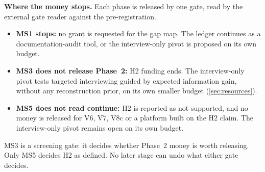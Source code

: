 \begin{keyquestionbox}
  \textbf{Where the money stops.} Each phase is released by one gate, read by the external gate
  reader against the pre-registration.
  \begin{itemize}[noitemsep]
    \item \textbf{MS1 stops:} no grant is requested for the gap map. The ledger continues as a
      documentation-audit tool, or the interview-only pivot is proposed on its own budget.
    \item \textbf{MS3 does not release Phase~2:} H2 funding ends. The interview-only pivot tests
      targeted interviewing guided by expected information gain, without any reconstruction
      prior, on its own smaller budget (\cref{sec:resources}).
    \item \textbf{MS5 does not read continue:} H2 is reported as not supported, and no money is
      released for V6, V7, V8c or a platform built on the H2 claim. The interview-only pivot
      remains open on its own budget.
  \end{itemize}
  MS3 is a screening gate: it decides whether Phase~2 money is worth releasing. Only MS5 decides
  H2 as defined. No later stage can undo what either gate decides.
\end{keyquestionbox}
